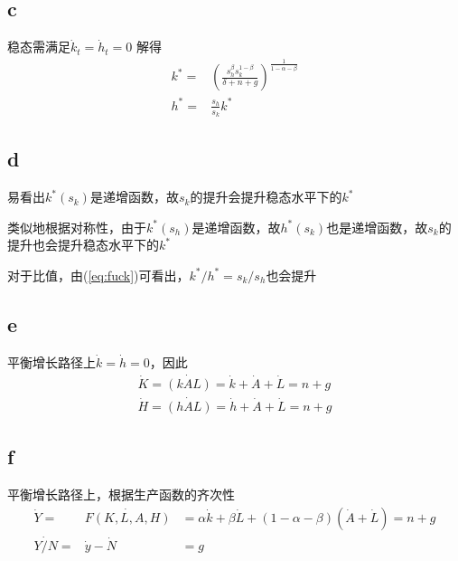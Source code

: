 \documentclass[a4paper,12pt]{ctexart}
\begin{document}
\subsection*{c}
稳态需满足$\dot{k}_t=\dot{h}_t=0$
解得
\begin{eqnarray}
    k^*=&\displaystyle(\frac{s_h^\beta s_k^{1-\beta}}{\delta+n+g})^{\frac{1}{1-\alpha-\beta}}\\
    h^*=&\displaystyle\frac{s_h}{s_k}k^*\label{eq:fuck}
\end{eqnarray}

\subsection*{d}
易看出$k^*(s_k)$是递增函数，故$s_k$的提升会提升稳态水平下的$k^*$

类似地根据对称性，由于$k^*(s_h)$是递增函数，故$h^*(s_k)$也是递增函数，故$s_k$的提升也会提升稳态水平下的$k^*$

对于比值，由(\ref{eq:fuck})可看出，$k^*/h^*=s_k/s_h$也会提升

\subsection*{e}
平衡增长路径上$\dot{k}=\dot{h}=0$，因此
\begin{eqnarray*}
    \dot{K}=\dot{(kAL)}=\dot{k}+\dot{A}+\dot{L}=n+g\\
    \dot{H}=\dot{(hAL)}=\dot{h}+\dot{A}+\dot{L}=n+g
\end{eqnarray*}

\subsection*{f}
平衡增长路径上，根据生产函数的齐次性
\begin{eqnarray*}
    \dot{Y}=&\dot{F(K,L,A,H)}&=\alpha\dot{k}+\beta\dot{L}+(1-\alpha-\beta)(\dot{A}+\dot{L})=n+g\\
    \dot{Y/N}=&\dot{y}-\dot{N}&=g
\end{eqnarray*}
\end{document}
